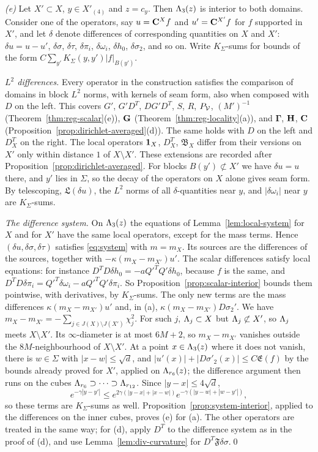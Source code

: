 \emph{(e)} Let $X'\subset X$, $y\in X'_{(4)}$ and $z=c_y$. Then $\Lambda_3(z)$ is interior to both domains. Consider one of the operators, say $u=\mathbf C^Xf$ and $u'=\mathbf C^{X'}f$ for $f$ supported in $X'$, and let $\delta$ denote differences of corresponding quantities on $X$ and $X'$: $\delta u=u-u'$, $\delta\sigma$, $\delta\tau$, $\delta\pi_i$, $\delta\omega_i$, $\delta h_0$, $\delta\sigma_2$, and so on. Write $K_\Sigma$-sums for bounds of the form $C\sum_{y'}K_\Sigma(y,y')|f|_{B(y')}$.

\emph{$L^2$ differences.} Every operator in the construction satisfies the comparison of domains in block $L^2$ norms, with kernels of seam form, also when composed with $D$ on the left. This covers $G'$, $G'D^T$, $DG'D^T$, $S$, $R$, $P_\mathcal V$, $(M')^{-1}$ (Theorem~\ref{thm:reg-scalar}(e)), $\mathbf G$ (Theorem~\ref{thm:reg-locality}(a)), and $\boldsymbol\Gamma$, $\mathbf H$, $\mathbf C$ (Proposition~\ref{prop:dirichlet-averaged}(d)). The same holds with $D$ on the left and $D^T_X$ on the right. The local operators $\mathbf 1_X$, $D^T_X$, $\mathfrak B_X$ differ from their versions on $X'$ only within distance $1$ of $X\setminus X'$. These extensions are recorded after Proposition~\ref{prop:dirichlet-averaged}. For blocks $B(y')\not\subset X'$ we have $\delta u=u$ there, and $y'$ lies in $\Sigma$, so the decay of the operators on $X$ alone gives seam form. By telescoping, $\mathfrak L(\delta u)$, the $L^2$ norms of all $\delta$-quantities near $y$, and $|\delta\omega_i|$ near $y$ are $K_\Sigma$-sums.

\emph{The difference system.} On $\Lambda_3(z)$ the equations of Lemma~\ref{lem:local-system} for $X$ and for $X'$ have the same local operators, except for the mass terms. Hence $(\delta u,\delta\sigma,\delta\tau)$ satisfies \eqref{eq:system} with $m=m_X$. Its sources are the differences of the sources, together with $-\kappa(m_X-m_{X'})u'$. The scalar differences satisfy local equations: for instance $D^TD\delta h_0=-aQ'^TQ'\delta h_0$, because $f$ is the same, and $D^TD\delta\pi_i=Q'^T\delta\omega_i-aQ'^TQ'\delta\pi_i$. So Proposition~\ref{prop:scalar-interior} bounds them pointwise, with derivatives, by $K_\Sigma$-sums. The only new terms are the mass differences $\kappa(m_X-m_{X'})u'$ and, in (a), $\kappa(m_X-m_{X'})D\sigma_2'$. We have $m_X-m_{X'}=-\sum_{j\in J(X)\setminus J(X')}\chi_j^2$. For such $j$, $\Lambda_j\subset X$ but $\Lambda_j\not\subset X'$, so $\Lambda_j$ meets $X\setminus X'$. Its $\infty$-diameter is at most $6M+2$, so $m_X-m_{X'}$ vanishes outside the $8M$-neighbourhood of $X\setminus X'$. At a point $x\in\Lambda_3(z)$ where it does not vanish, there is $w\in\Sigma$ with $|x-w|\le\sqrt d$, and $|u'(x)|+|D\sigma'_2(x)|\le C\mathfrak E(f)$ by the bounds already proved for $X'$, applied on $\Lambda_{r_6}(z)$; the difference argument then runs on the cubes $\Lambda_{r_6}\supset\dots\supset\Lambda_{r_{12}}$. Since $|y-x|\le4\sqrt d$,
\[
e^{-\gamma|y-y'|}\le e^{2\gamma(|y-x|+|x-w|)}e^{-\gamma(|y-w|+|w-y'|)},
\]
so these terms are $K_\Sigma$-sums as well. Proposition~\ref{prop:system-interior}, applied to the differences on the inner cubes, proves (e) for (a). The other operators are treated in the same way; for (d), apply $D^T$ to the difference system as in the proof of (d), and use Lemma~\ref{lem:div-curvature} for $D^T\mathfrak F\delta\sigma$.\qed
